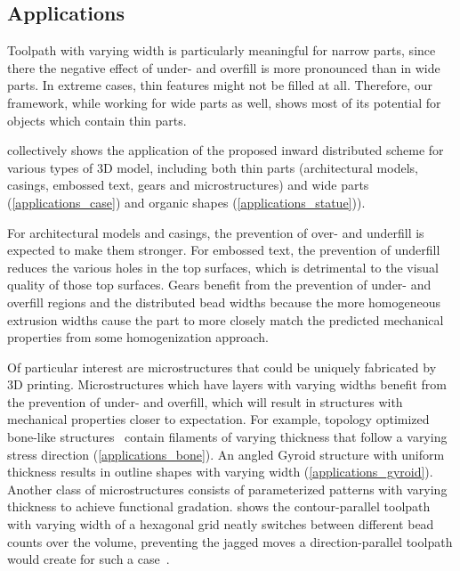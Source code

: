 \subsection{Applications}
Toolpath with varying width is particularly meaningful for narrow parts, since there the negative effect of under- and overfill is more pronounced than in wide parts.
In extreme cases, thin features might not be filled at all.
Therefore, our framework, while working for wide parts as well, shows most of its potential for objects which contain thin parts.

 collectively shows the application of the proposed inward distributed scheme for various types of 3D model, including both thin parts (architectural models, casings, embossed text, gears and microstructures) and wide parts (\cref{applications_case}) and organic shapes (\cref{applications_statue})).

For architectural models and casings, the prevention of over- and underfill is expected to make them stronger. 
For embossed text, the prevention of underfill reduces the various holes in the top surfaces, which is detrimental to the visual quality of those top surfaces.
Gears benefit from the prevention of under- and overfill regions and the distributed bead widths because the more homogeneous extrusion widths cause the part to more closely match the predicted mechanical properties from some homogenization approach.

Of particular interest are microstructures that could be uniquely fabricated by 3D printing.
Microstructures which have layers with varying widths benefit from the prevention of under- and overfill, which will result in structures with mechanical properties closer to expectation.
For example, topology optimized bone-like structures~\cite{wu2017infill} contain filaments of varying thickness that follow a varying stress direction (\cref{applications_bone}).
An angled Gyroid structure with uniform thickness results in outline shapes with varying width (\cref{applications_gyroid}).
Another class of microstructures consists of parameterized patterns with varying thickness to achieve functional gradation.
 shows the contour-parallel toolpath with varying width of a hexagonal grid neatly switches between different bead counts over the volume, preventing the jagged moves a direction-parallel toolpath would create for such a case~\cite{bates2018compressive}.


